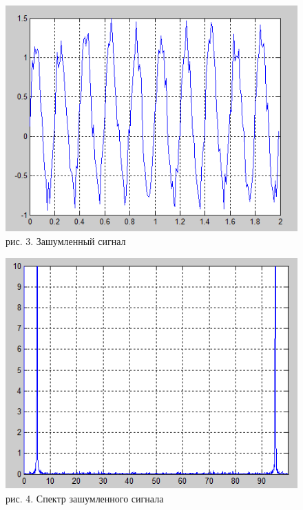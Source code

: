 \documentclass[10pt,a4paper]{report}
\begin{document}
\begin{figure}
\begin{center}
\includegraphics[angle=0, scale = 0.9]{3.png}\newline
рис. 3. Зашумленный сигнал\newline
\end{center}
\begin{center}
\includegraphics[angle=0, scale = 0.9]{4.png}\newline
рис. 4. Спектр зашумленного сигнала\newline
\end{center}
\end{figure}
\clearpage
\end{document}
